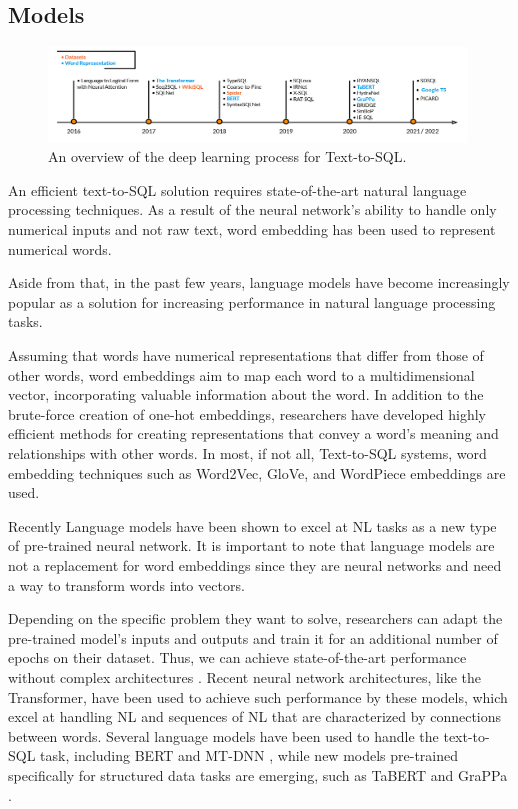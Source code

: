 \subsection*{Models}

\begin{figure}[htb]
    \centering
    \includegraphics[width=0.99\textwidth]{pics/Timeline.png}
    \caption{An overview of the deep learning process for Text-to-SQL.}
    \label{fig:timeline}
\end{figure}

An efficient text-to-SQL solution requires state-of-the-art natural language processing techniques.
As a result of the neural network's ability to handle only numerical inputs and not raw text, word embedding has been used to represent numerical words.

Aside from that, in the past few years, language models have become increasingly popular as a solution for increasing performance in natural language processing tasks.

Assuming that words have numerical representations that differ from those of other words, word embeddings aim to map each word to a multidimensional vector, incorporating valuable information about the word. In addition to the brute-force creation of one-hot embeddings, researchers have developed highly efficient methods for creating representations that convey a word's meaning and relationships with other words. In most, if not all, Text-to-SQL systems, word embedding techniques such as Word2Vec\cite{DBLP:journals/corr/Rong14}, GloVe\cite{pennington-etal-2014-glove}, and WordPiece embeddings\cite{DBLP:journals/corr/WuSCLNMKCGMKSJL16} are used.

Recently Language models have been shown to excel at NL tasks as a new type of pre-trained neural network. It is important to note that language models are not a replacement for word embeddings since they are neural networks and need a way to transform words into vectors.

Depending on the specific problem they want to solve, researchers can adapt the pre-trained model's inputs and outputs and train it for an additional number of epochs on their dataset. Thus, we can achieve state-of-the-art performance without complex architectures \cite{DBLP:journals/corr/abs-1810-04805}. Recent neural network architectures, like the Transformer\cite{DBLP:journals/corr/VaswaniSPUJGKP17}, have been used to achieve such performance by these models, which excel at handling NL and sequences of NL that are characterized by connections between words. Several language models have been used to handle the text-to-SQL task, including BERT \cite{DBLP:journals/corr/abs-1810-04805} and MT-DNN \cite{DBLP:journals/corr/abs-1901-11504}, while new models pre-trained specifically for structured data tasks are emerging, such as TaBERT\cite{DBLP:journals/corr/abs-2005-08314} and GraPPa \cite{DBLP:journals/corr/abs-2009-13845}.


